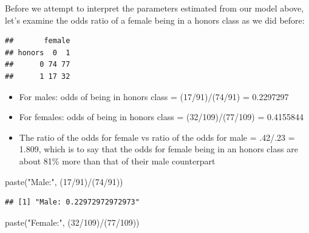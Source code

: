 \documentclass[
]{article}
\newenvironment{Shaded}{\begin{snugshade}}{\end{snugshade}}
\newcommand{\AttributeTok}[1]{\textcolor[rgb]{0.77,0.63,0.00}{#1}}
\newcommand{\DecValTok}[1]{\textcolor[rgb]{0.00,0.00,0.81}{#1}}
\newcommand{\FunctionTok}[1]{\textcolor[rgb]{0.00,0.00,0.00}{#1}}
\newcommand{\NormalTok}[1]{#1}
\newcommand{\SpecialCharTok}[1]{\textcolor[rgb]{0.00,0.00,0.00}{#1}}
\newcommand{\StringTok}[1]{\textcolor[rgb]{0.31,0.60,0.02}{#1}}
\providecommand{\tightlist}{%
  \setlength{\itemsep}{0pt}\setlength{\parskip}{0pt}}
\begin{document}
Before we attempt to interpret the parameters estimated from our model
above, let's examine the odds ratio of a female being in a honors class
as we did before:

\begin{Shaded}
\end{Shaded}

\begin{verbatim}
##       female
## honors  0  1
##      0 74 77
##      1 17 32
\end{verbatim}

\begin{itemize}
\tightlist
\item
  For males: odds of being in honors class = (17/91)/(74/91) =
  0.2297297\\
\item
  For females: odds of being in honors class = (32/109)/(77/109) =
  0.4155844\\
\item
  The ratio of the odds for female vs ratio of the odds for male =
  .42/.23 = 1.809, which is to say that the odds for female being in an
  honors class are about 81\% more than that of their male counterpart
\end{itemize}

\begin{Shaded}
\begin{Highlighting}[]
\FunctionTok{paste}\NormalTok{(}\StringTok{"Male:"}\NormalTok{, (}\DecValTok{17}\SpecialCharTok{/}\DecValTok{91}\NormalTok{)}\SpecialCharTok{/}\NormalTok{(}\DecValTok{74}\SpecialCharTok{/}\DecValTok{91}\NormalTok{))}
\end{Highlighting}
\end{Shaded}

\begin{verbatim}
## [1] "Male: 0.22972972972973"
\end{verbatim}

\begin{Shaded}
\begin{Highlighting}[]
\FunctionTok{paste}\NormalTok{(}\StringTok{"Female:"}\NormalTok{, (}\DecValTok{32}\SpecialCharTok{/}\DecValTok{109}\NormalTok{)}\SpecialCharTok{/}\NormalTok{(}\DecValTok{77}\SpecialCharTok{/}\DecValTok{109}\NormalTok{))}
\end{Highlighting}
\end{Shaded}
\end{document}
